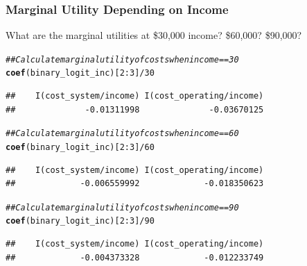 \documentclass{beamer}\usepackage[]{graphicx}\usepackage[]{color}
\makeatletter
\newcommand{\hlnum}[1]{\textcolor[rgb]{0.686,0.059,0.569}{#1}}%
\newcommand{\hlcom}[1]{\textcolor[rgb]{0.678,0.584,0.686}{\textit{#1}}}%
\newcommand{\hlopt}[1]{\textcolor[rgb]{0,0,0}{#1}}%
\newcommand{\hlstd}[1]{\textcolor[rgb]{0.345,0.345,0.345}{#1}}%
\newcommand{\hlkwd}[1]{\textcolor[rgb]{0.737,0.353,0.396}{\textbf{#1}}}%
\newenvironment{kframe}{%
 \def\at@end@of@kframe{}%
 \ifinner\ifhmode%
  \def\at@end@of@kframe{\end{minipage}}%
  \begin{minipage}{\columnwidth}%
 \fi\fi%
 \def\FrameCommand##1{\hskip\@totalleftmargin \hskip-\fboxsep
 \colorbox{shadecolor}{##1}\hskip-\fboxsep
     \hskip-\linewidth \hskip-\@totalleftmargin \hskip\columnwidth}%
 \MakeFramed {\advance\hsize-\width
   \@totalleftmargin\z@ \linewidth\hsize
   \@setminipage}}%
 {\par\unskip\endMakeFramed%
 \at@end@of@kframe}
\newenvironment{knitrout}{}{} %
\makeatother
\begin{document}
\begin{frame}[fragile]\frametitle{Marginal Utility Depending on Income}
    What are the marginal utilities at \$30,000 income? \$60,000? \$90,000?
\begin{knitrout}\footnotesize
{}\color{fgcolor}\begin{kframe}
\begin{alltt}
\hlcom{## Calculate marginal utility of costs when income == 30}
\hlkwd{coef}\hlstd{(binary_logit_inc)[}\hlnum{2}\hlopt{:}\hlnum{3}\hlstd{]} \hlopt{/} \hlnum{30}
\end{alltt}
\begin{verbatim}
##    I(cost_system/income) I(cost_operating/income) 
##              -0.01311998              -0.03670125
\end{verbatim}
\begin{alltt}
\hlcom{## Calculate marginal utility of costs when income == 60}
\hlkwd{coef}\hlstd{(binary_logit_inc)[}\hlnum{2}\hlopt{:}\hlnum{3}\hlstd{]} \hlopt{/} \hlnum{60}
\end{alltt}
\begin{verbatim}
##    I(cost_system/income) I(cost_operating/income) 
##             -0.006559992             -0.018350623
\end{verbatim}
\begin{alltt}
\hlcom{## Calculate marginal utility of costs when income == 90}
\hlkwd{coef}\hlstd{(binary_logit_inc)[}\hlnum{2}\hlopt{:}\hlnum{3}\hlstd{]} \hlopt{/} \hlnum{90}
\end{alltt}
\begin{verbatim}
##    I(cost_system/income) I(cost_operating/income) 
##             -0.004373328             -0.012233749
\end{verbatim}
\end{kframe}
\end{knitrout}
\end{frame}
\end{document}
